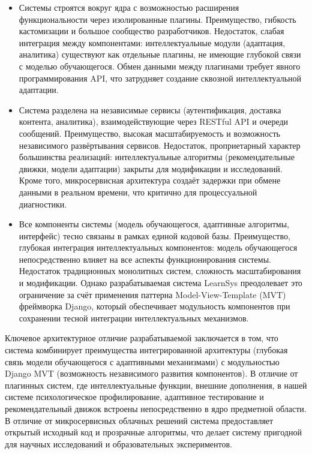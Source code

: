 \begin{itemize}
\item Системы строятся вокруг ядра с возможностью расширения функциональности через 
изолированные плагины. Преимущество, гибкость кастомизации и большое сообщество 
разработчиков. Недостаток, слабая интеграция между компонентами: интеллектуальные 
модули (адаптация, аналитика) существуют как отдельные плагины, не имеющие глубокой 
связи с моделью обучающегося. Обмен данными между плагинами требует явного 
программирования API, что затрудняет создание сквозной интеллектуальной адаптации.
\item Система разделена на независимые сервисы (аутентификация, доставка контента, 
аналитика), взаимодействующие через RESTful API и очереди сообщений. 
Преимущество, высокая масштабируемость и возможность независимого развёртывания 
сервисов. Недостаток, проприетарный характер большинства реализаций: 
интеллектуальные алгоритмы (рекомендательные движки, модели адаптации) закрыты 
для модификации и исследований. Кроме того, микросервисная архитектура создаёт 
задержки при обмене данными в реальном времени, что критично для процессуальной 
диагностики.
\item Все компоненты системы (модель обучающегося, адаптивные алгоритмы, интерфейс) 
тесно связаны в рамках единой кодовой базы. Преимущество, глубокая интеграция 
интеллектуальных компонентов: модель обучающегося непосредственно влияет на все 
аспекты функционирования системы. Недостаток традиционных монолитных систем, 
сложность масштабирования и модификации. Однако разрабатываемая система LearnSys 
преодолевает это ограничение за счёт применения паттерна Model-View-Template (MVT) 
фреймворка Django, который обеспечивает модульность компонентов при сохранении 
тесной интеграции интеллектуальных механизмов.
\end{itemize}

Ключевое архитектурное отличие разрабатываемой заключается в том, что система 
комбинирует преимущества интегрированной архитектуры (глубокая связь модели 
обучающегося с адаптивными механизмами) с модульностью Django MVT (возможность 
независимого развития компонентов). В отличие от плагинных систем, где 
интеллектуальные функции, внешние дополнения, в нашей системе психологическое 
профилирование, адаптивное тестирование и рекомендательный движок встроены 
непосредственно в ядро предметной области. В отличие от микросервисных облачных 
решений система предоставляет открытый исходный код и прозрачные алгоритмы, 
что делает систему пригодной для научных исследований и образовательных 
экспериментов.

